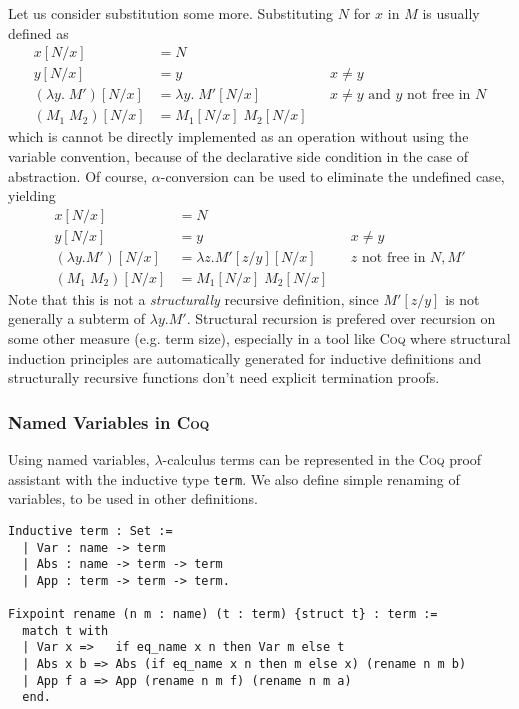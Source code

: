 \documentclass[a4paper,11pt]{article}
\newcommand{\name}[1]{\textsc{#1}\xspace}
\def\Coq{\name{Coq}}
\begin{document}
Let us consider substitution some more.
Substituting $N$ for $x$ in $M$ is usually defined as
\begin{align*}
  x[N/x]                 &= N\\
  y[N/x]                 &= y                      && \text{$x \neq y$} \\
  (\lambda y.\; M')[N/x] &= \lambda y. \; M'[N/x]  && \text{$x \neq y$ and $y$ not free in $N$} \\
  (M_1 \; M_2)[N/x]      &= M_1[N/x] \; M_2[N/x]
\end{align*}
which is cannot be directly implemented as an operation without using the
variable convention, because of the declarative side condition in the
case of abstraction.
Of course, $\alpha$-conversion can be used to eliminate the undefined
case, yielding
\begin{align*}
  x[N/x]              &= N\\
  y[N/x]              &= y                       && \text{$x \neq y$} \\
  (\lambda y.M')[N/x] &= \lambda z.M'[z/y][N/x]  && \text{$z$ not free in $N\!, M'$} \\
  (M_1 \; M_2)[N/x]   &= M_1[N/x] \; M_2[N/x]
\end{align*}
Note that this is not a {\em structurally} recursive definition, since
$M'[z/y]$ is not generally a subterm of $\lambda y.M'$.
Structural recursion is prefered over recursion on some other measure
(e.g. term size), especially in a tool like \Coq where structural
induction principles are automatically generated for inductive
definitions and structurally recursive functions don't need explicit
termination proofs.

\subsubsection*{Named Variables in \Coq}

Using named variables, $\lambda$-calculus terms can be represented in the
\Coq proof assistant with the inductive type \lstinline{term}. We also
define simple renaming of variables, to be used in other definitions.
\begin{lstlisting}
Inductive term : Set :=
  | Var : name -> term
  | Abs : name -> term -> term
  | App : term -> term -> term.

Fixpoint rename (n m : name) (t : term) {struct t} : term :=
  match t with
  | Var x =>   if eq_name x n then Var m else t
  | Abs x b => Abs (if eq_name x n then m else x) (rename n m b)
  | App f a => App (rename n m f) (rename n m a)
  end.
\end{lstlisting}
\end{document}
